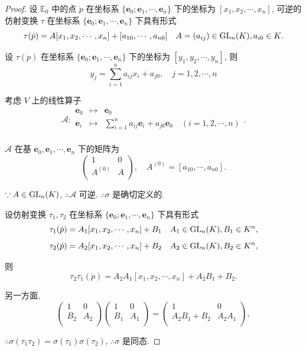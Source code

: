 \documentclass{ctexart}
\begin{document}
\begin{proof}
    设 $\mathbb{E}_0$ 中的点 $\dot{p}$ 在坐标系 $\{\boldsymbol{e}_0;\boldsymbol{e}_1,\cdots,\boldsymbol{e}_n\}$ 下的坐标为 $[x_1,x_2,\cdots,x_n]$, 可逆的仿射变换 $\tau$ 在坐标系 $\{\boldsymbol{e}_0;\boldsymbol{e}_1,\cdots,\boldsymbol{e}_n\}$ 下具有形式
    \[\tau(\dot{p})=A[x_1,x_2,\cdots,x_n]+[a_{10},\cdots,a_{n0}]\quad A=(a_{ij})\in\operatorname{GL} _n(K),a_{i0}\in K.\]

    设 $\tau(\dot{p})$ 在坐标系 $\{\boldsymbol{e}_0;\boldsymbol{e}_1,\cdots,\boldsymbol{e}_n\}$ 下的坐标为 $[y_1,y_2,\cdots,y_n]$, 则
    \[y_j=\sum\limits_{i=1}^na_{ij}x_i+a_{j0},\quad j=1,2,\cdots,n\]

    考虑 $V$ 上的线性算子
    \[\mathcal{A}:\begin{array}{rcl}
        \boldsymbol{e}_0 & \mapsto & \boldsymbol{e}_0 \\
        \boldsymbol{e}_i & \mapsto & \sum\limits_{i=1}^na_{ij}\boldsymbol{e}_i+a_{j0}\boldsymbol{e}_0\quad(i=1,2,\cdots,n) \\
    \end{array}.\]

    $\mathcal{A}$ 在基 $\boldsymbol{e}_0,\boldsymbol{e}_1,\cdots,\boldsymbol{e}_n$ 下的矩阵为
    \[\begin{pmatrix}
        1 & 0 \\
        A^{(0)} & A \\
    \end{pmatrix},\quad A^{(0)}=[a_{10},\cdots,a_{n0}].\]

    $\because A\in\operatorname{GL} _n(K)$, $\therefore\mathcal{A}$ 可逆. $\therefore\sigma$ 是确切定义的.

    设仿射变换 $\tau_1,\tau_2$ 在坐标系 $\{\boldsymbol{e}_0;\boldsymbol{e}_1,\cdots,\boldsymbol{e}_n\}$ 下具有形式
    \[\tau_1(\dot{p})=A_1[x_1,x_2,\cdots,x_n]+B_1\quad A_1\in\operatorname{GL} _n(K),B_1\in K^n,\]
    \[\tau_2(\dot{p})=A_2[x_1,x_2,\cdots,x_n]+B_2\quad A_2\in\operatorname{GL} _n(K),B_2\in K^n,\]

    则
    \[\tau_2\tau_1(\dot{p})=A_2A_1[x_1,x_2,\cdots,x_n]+A_2B_1+B_2.\]

    另一方面,
    \[\begin{pmatrix}
        1 & 0 \\
        B_2 & A_2 \\
    \end{pmatrix}\begin{pmatrix}
        1 & 0 \\
        B_1 & A_1 \\
    \end{pmatrix}=\begin{pmatrix}
        1 & 0 \\
        A_2B_1+B_2 & A_2A_1 \\
    \end{pmatrix},\]

    $\therefore\sigma(\tau_1\tau_2)=\sigma(\tau_1)\sigma(\tau_2)$, $\therefore\sigma$ 是同态.
\end{proof}
\end{document}
